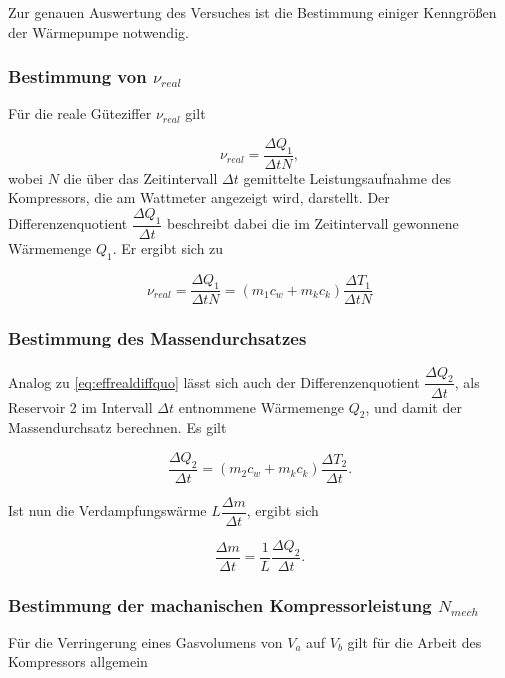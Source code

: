 Zur genauen Auswertung des Versuches ist die Bestimmung einiger Kenngrößen der Wärmepumpe notwendig.

\subsubsection{Bestimmung von $ν_{real}$}

Für die reale Güteziffer $ν_{real}$ gilt

\begin{equation}
    ν_{real} = \dfrac{ΔQ_1}{ΔtN},
\end{equation}
wobei $N$ die über das Zeitintervall $Δt$ gemittelte Leistungsaufnahme des Kompressors, die am Wattmeter angezeigt wird, darstellt. 
Der Differenzenquotient $\dfrac{ΔQ_1}{Δt}$ beschreibt dabei die im Zeitintervall gewonnene Wärmemenge $Q_1$. Er ergibt sich zu

\begin{equation}
    ν_{real} = \dfrac{ΔQ_1}{ΔtN} = (m_1c_w + m_kc_k)\dfrac{ΔT_1}{ΔtN}
    \label{eq:effrealdiffquo}
\end{equation}

\subsubsection{Bestimmung des Massendurchsatzes}

Analog zu \eqref{eq:effrealdiffquo} lässt sich auch der Differenzenquotient $\dfrac{ΔQ_2}{Δt}$, als Reservoir 2 im Intervall $Δt$ entnommene Wärmemenge $Q_2$, und damit der Massendurchsatz berechnen.
Es gilt

\begin{equation}
    \label{eq:Massendurch}
    \dfrac{ΔQ_2}{Δt} = (m_2c_w +m_kc_k)\dfrac{ΔT_2}{Δt}.
\end{equation}

Ist nun die Verdampfungswärme $L\dfrac{Δm}{Δt}$, ergibt sich

\begin{equation}
    \dfrac{Δm}{Δt} = \dfrac{1}{L}\dfrac{ΔQ_2}{Δt}.
    \label{eq:Massendurch2}
\end{equation}

\newpage

\subsubsection{Bestimmung der machanischen Kompressorleistung $N_{mech}$}

Für die Verringerung eines Gasvolumens von $V_a$ auf $V_b$ gilt für die Arbeit des Kompressors allgemein

